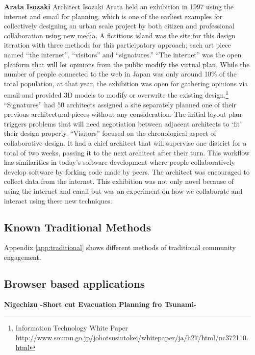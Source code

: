 \textbf{Arata Isozaki}
Architect Isozaki Arata held an exhibition in 1997 using the internet and
email for planning, which is one of the earliest examples for collectively
designing an urban scale project by both citizen and professional
collaboration using new media.
A fictitious island was the site for this design iteration with three
methods for this participatory approach; each art piece named ``the
internet'', ``visitors'' and ``signatures.'' 
``The internet'' was the open platform that will let opinions from the public
modify the virtual plan. While the number of people connected to the web in
Japan was only around 10\% of the total population, at that year, the
exhibition was open for gathering opinions via email and provided 3D models
to modify or overwrite the existing design.\footnote{Information Technology White Paper
\url{http://www.soumu.go.jp/johotsusintokei/whitepaper/ja/h27/html/nc372110.html}}
“Signatures” had 50 architects assigned a site separately planned one of
their previous architectural pieces without any consideration. The initial
layout plan triggers problems that will need negotiation between adjacent
architects to `fit' their design properly.
``Visitors'' focused on the chronological aspect of collaborative design.
It had a chief architect that will supervise one district for a total of
two weeks, passing it to the next architect after their turn. This workflow
has similarities in today's software development where people
collaboratively develop software by forking code made by peers. The
architect was encouraged to collect data from the internet.
This exhibition was not only novel because of using the internet and email
but was an experiment on how we collaborate and interact using these new
techniques.

\subsection{Known Traditional Methods}
Appendix \ref{app:traditional} shows different methods of traditional community engagement.

\subsection{Browser based applications}

\textbf{Nigechizu -Short cut Evacuation Planning fro Tsunami-}

